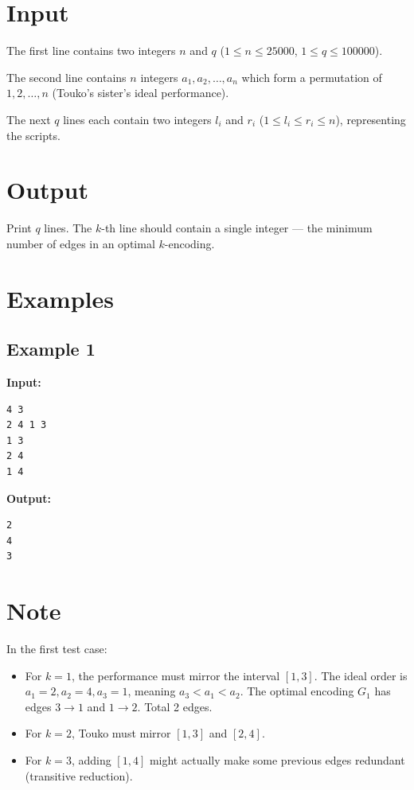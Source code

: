 \documentclass[11pt]{article}
\begin{document}
\section*{Input}

The first line contains two integers $n$ and $q$ ($1 \le n \le 25000$, $1 \le q \le 100000$).

The second line contains $n$ integers $a_1, a_2, \dots, a_n$ which form a permutation of $1, 2, \dots, n$ (Touko's sister's ideal performance).

The next $q$ lines each contain two integers $l_i$ and $r_i$ ($1 \le l_i \le r_i \le n$), representing the scripts.

\section*{Output}

Print $q$ lines. The $k$-th line should contain a single integer --- the minimum number of edges in an optimal $k$-encoding.

\section*{Examples}

\subsection*{Example 1}
\textbf{Input:}
\begin{verbatim}
4 3
2 4 1 3
1 3
2 4
1 4
\end{verbatim}

\textbf{Output:}
\begin{verbatim}
2
4
3
\end{verbatim}

\section*{Note}

In the first test case:
\begin{itemize}
    \item For $k=1$, the performance must mirror the interval $[1,3]$. The ideal order is $a_1=2, a_2=4, a_3=1$, meaning $a_3 < a_1 < a_2$. The optimal encoding $G_1$ has edges $3 \to 1$ and $1 \to 2$. Total 2 edges.
    \item For $k=2$, Touko must mirror $[1,3]$ and $[2,4]$.
    \item For $k=3$, adding $[1,4]$ might actually make some previous edges redundant (transitive reduction).
\end{itemize}
\end{document}
